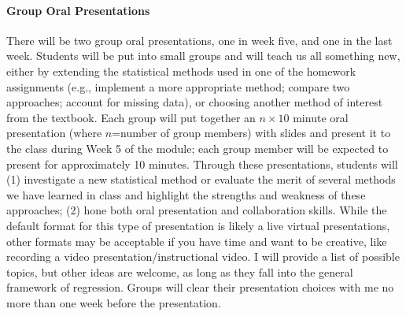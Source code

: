\documentclass[11pt]{article}
\begin{document}
\paragraph{Group Oral Presentations}
There will be two group oral presentations, one in week five, and one in the last week. Students will be put into small groups and will teach us all something new, either by extending the statistical methods used in one of the homework assignments (e.g., implement a more appropriate method; compare two approaches; account for missing data), or choosing another method of interest from the textbook. Each group will put together an $n\times 10$ minute oral presentation (where $n$=number of group members) with slides and present it to the class during Week 5 of the module; each group member will be expected to present for approximately 10 minutes. Through these presentations, students will (1) investigate a new statistical method or evaluate the merit of several methods we have learned in class and highlight the strengths and weakness of these approaches; (2) hone both oral presentation and collaboration skills. While the default format for this type of presentation is likely a live virtual presentations, other formats may be acceptable if you have time and want to be creative, like recording a video presentation/instructional video. I will provide a list of possible topics, but other ideas are welcome, as long as they fall into the general framework of regression. Groups will clear their presentation choices with me no more than one week before the presentation. 

\end{document}
